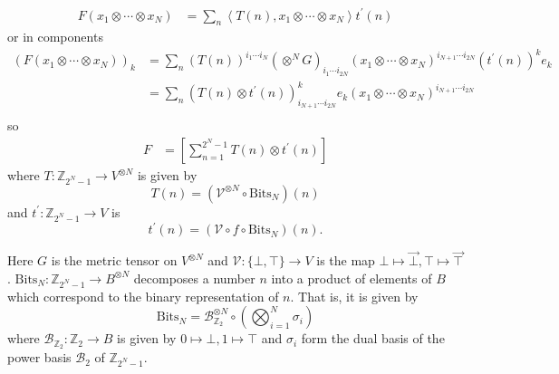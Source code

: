 \documentclass{article}
\begin{document}
\begin{align*}
F\left(x_1 \otimes \cdots \otimes x_N\right)
  &= \sum_{n} \left\langle
                T(n),
                x_1 \otimes \cdots \otimes x_N
              \right\rangle
              t^{\prime}(n)
\end{align*}
or in components
\begin{align*}
  \left(F\left(x_1 \otimes \cdots \otimes x_N\right)\right)_k
  &= \sum_{n} \left(T(n)\right)^{i_1 \cdots i_N}
              \left(\otimes^{N} G\right)_{i_1 \cdots i_{2N}}
              \left(x_1 \otimes \cdots \otimes x_{N}\right)^{i_{N+1} \cdots i_{2N}}
              \left(t^{\prime}(n)\right)^k e_k \\
  &= \sum_{n} \left(T(n) \otimes t^{\prime}(n)\right)_{i_{N+1} \cdots i_{2N}}^{k}
              e_k
              \left(x_1 \otimes \cdots \otimes x_{N}\right)^{i_{N+1} \cdots i_{2N}} \\
\end{align*}
so
\begin{align*}
  F &= \left[\sum_{n=1}^{2^{N} - 1} T(n) \otimes t^{\prime}(n)\right]
\end{align*}
where $T : \mathbb{Z}_{2^{N} - 1} \to V^{\otimes N}$ is given by
$$
T(n) = \left(\mathcal{V}^{\otimes N} \circ \mathrm{Bits}_N\right)(n)
$$
and $t^{\prime} : \mathbb{Z}_{2^{N} - 1} \to V$ is
$$
t^{\prime}(n) = \left(\mathcal{V} \circ f \circ \mathrm{Bits}_N\right)(n).
$$

Here $G$ is the metric tensor on $V^{\otimes N}$ and
$\mathcal{V} : \{\bot, \top\} \to V$ is the map
$\bot \mapsto \vec{\bot}, \top \mapsto \vec{\top}$.
$\mathrm{Bits}_N : \mathbb{Z}_{2^N - 1} \to B^{\otimes N}$
decomposes a number $n$ into a product of elements of $B$
which correspond to the binary representation of $n$.
That is, it is given by
$$
\mathrm{Bits}_N = \mathcal{B}_{\mathbb{Z}_{2}}^{\otimes N}
            \circ \left(\bigotimes_{i=1}^N \sigma_i\right)
$$
where $\mathcal{B}_{\mathbb{Z}_{2}} : \mathbb{Z}_{2} \to B$ is
given by $0 \mapsto \bot, 1 \mapsto \top$ and $\sigma_i$ form the
dual basis of the power basis $\mathscr{B}_2$ of
$\mathbb{Z}_{2^N - 1}$.
\end{document}
